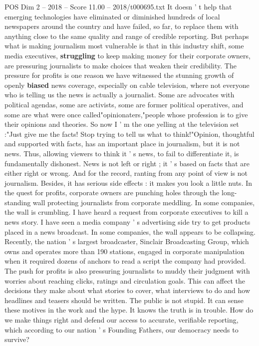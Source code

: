 \begin{textsample}{POS Dim 2 – 2018 – Score 11.00 – 2018/t000695.txt}
It doesn ' t help that emerging technologies have eliminated or diminished hundreds of local newspapers around the country and have failed, so far, to replace them with anything close to the same quality and range of credible reporting.
But perhaps what is making journalism most vulnerable is that in this industry shift, some media executives, \textbf{struggling} to keep making money for their corporate owners, are pressuring journalists to make choices that weaken their credibility.
The pressure for profits is one reason we have witnessed the stunning growth of openly \textbf{biased} news coverage, especially on cable television, where not everyone who is telling us the news is actually a journalist.
Some are advocates with political agendas, some are activists, some are former political operatives, and some are what were once called"opinionaters,"people whose profession is to give their opinions and theories.
So now I ' m the one yelling at the television set :"Just give me the facts!
Stop trying to tell us what to think!"Opinion, thoughtful and supported with facts, has an important place in journalism, but it is not news.
Thus, allowing viewers to think it ' s news, to fail to differentiate it, is fundamentally dishonest.
News is not left or right ; it ' s based on facts that are either right or wrong.
And for the record, ranting from any point of view is not journalism.
Besides, it has serious side effects : it makes you look a little nuts.
In the quest for profits, corporate owners are punching holes through the long-standing wall protecting journalists from corporate meddling.
In some companies, the wall is crumbling.
I have heard a request from corporate executives to kill a news story.
I have seen a media company ' s advertising side try to get products placed in a news broadcast.
In some companies, the wall appears to be collapsing.
Recently, the nation ' s largest broadcaster, Sinclair Broadcasting Group, which owns and operates more than 190 stations, engaged in corporate manipulation when it required dozens of anchors to read a script the company had provided.
The push for profits is also pressuring journalists to muddy their judgment with worries about reaching clicks, ratings and circulation goals.
This can affect the decisions they make about what stories to cover, what interviews to do and how headlines and teasers should be written.
The public is not stupid.
It can sense these motives in the work and the hype.
It knows the truth is in trouble.
How do we make things right and defend our access to accurate, verifiable reporting, which according to our nation ' s Founding Fathers, our democracy needs to survive?

\end{textsample}
